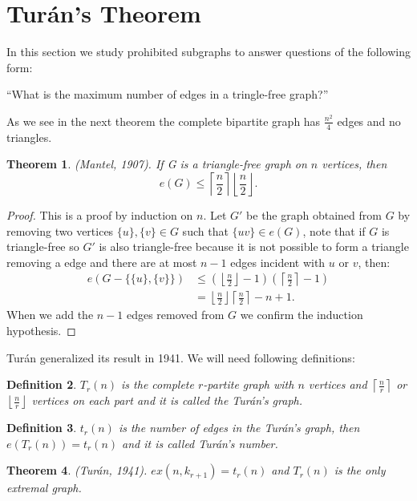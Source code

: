 \documentclass[12pt,twoside,a4paper]{book}
\numberwithin{equation}{section}
\newtheorem{theorem}             {Theorem}[section]
\newtheorem{definition}	[theorem] {Definition}
\theoremstyle{remark}
\begin{document}
\section{Turán's Theorem}
In this section we study prohibited subgraphs to answer questions of the following form: 
\begin{center}``What is the maximum number of edges in a tringle-free graph?''\end{center}
As we see in the next theorem the complete bipartite graph has $\frac{n^{2}}{4}$ edges and no triangles.\\
\begin{theorem}
(Mantel, 1907). If G is a triangle-free graph on $n$ vertices, then 
$$e(G) \leq \left\lceil \frac{n}{2} \right\rceil \left\lfloor \frac{n}{2} \right\rfloor .$$
\end{theorem}
\begin{proof}
This is a proof by induction on $n$. Let $G'$ be the graph obtained from $G$ by removing two vertices $\{u\},\{v\} \in G$ such that $\{uv\}\in e(G)$, note that if $G$ is triangle-free so $G'$ is also triangle-free because it is not possible to form a triangle removing a edge and there are at most $n-1$ edges incident with $u$ or $v$, then:
\begin{align*}
e(G-\{\{u\},\{v\}\}) &\leq (\left\lfloor \frac{n}{2} \right\rfloor -1)(\left\lceil \frac{n}{2} \right\rceil -1) \\
&= \left\lfloor \frac{n}{2} \right\rfloor \left\lceil \frac{n}{2} \right\rceil - n +1.
\end{align*}
When we add the $n-1$ edges removed from $G$ we confirm the induction hypothesis. 
\end{proof}

Turán generalized its result in 1941. We will need following definitions: 
\begin{definition}$T_r(n)$ is the complete $r$-partite graph with $n$ vertices and $\left\lceil \frac{n}{r} \right\rceil$ or $\left\lfloor \frac{n}{r} \right\rfloor$ vertices on each part and it is called the Turán's graph.
\end{definition}

\begin{definition}
$t_r(n)$ is the number of edges in the Turán's graph, then $e(T_r(n)) = t_r(n)$ and it is called Turán's number.
\end{definition}

\begin{theorem} \label{theorem:turan1941}(Turán, 1941). $ex(n, k_{r+1}) = t_r(n)$ and $T_r(n)$ is the only extremal graph.
\end{theorem}
\end{document}
